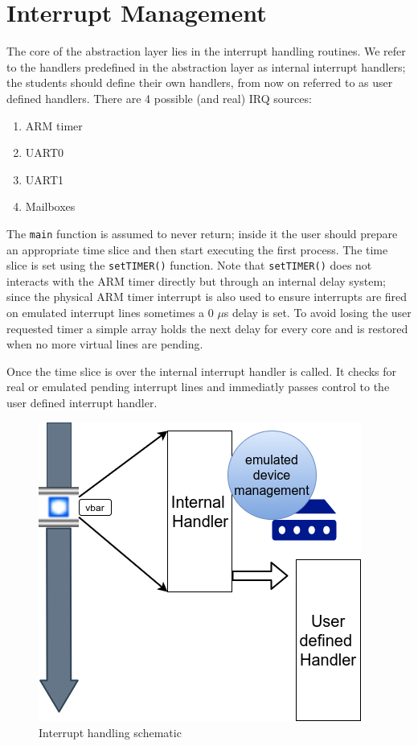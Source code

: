 \documentclass[12pt,a4paper,openright,twoside]{report}
\begin{document}
\section{Interrupt Management}
\label{regcorruption}
The core of the abstraction layer lies in the interrupt handling routines. We refer
to the handlers predefined in the abstraction layer as internal interrupt handlers;
 the students should define their own handlers, from now on referred to as user defined handlers.
There are 4 possible (and real) IRQ sources:
\begin{enumerate}
    \item ARM timer
    \item UART0
    \item UART1
    \item Mailboxes
\end{enumerate}
The {\tt main} function is assumed to never return; inside it the user should
prepare an appropriate time slice and then start executing the first process.
The time slice is set using the {\tt setTIMER()} function.
Note that {\tt setTIMER()} does not interacts with the ARM timer directly but 
through an internal delay system; since the physical ARM timer interrupt is also
used to ensure interrupts are fired on emulated interrupt lines sometimes a
0 $\mu$s delay is set. To avoid losing the user requested timer a simple array 
holds the next delay for every core and is restored when no more virtual 
lines are pending.

 Once the time slice is over the internal interrupt handler is called. 
 It checks for real or emulated pending interrupt lines and immediatly
 passes control to the user defined interrupt handler.

 \begin{figure}[h]
    \begin{center}
 \includegraphics[scale=0.8]{images/tesi6.png}
 \caption[IRQ Switch]{Interrupt handling schematic}\label{fig:irq}
    \end{center}
 \end{figure}
\end{document}

